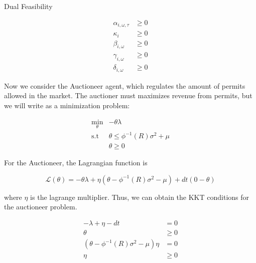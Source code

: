 \documentclass[11pt, letterpaper]{article}
\begin{document}
\smallskip

\begin{flushleft}
Dual Feasibility
\end{flushleft}

\begin{align}
    \alpha_{i,\omega,\tau} & \geq 0 \\
    \kappa_i & \geq 0 \\
    \beta_{i,\omega} & \geq 0 \\
    \gamma_{i,\omega} & \geq 0 \\
    \delta_{i,\omega} & \geq 0 
\end{align}

Now we consider the Auctioneer agent, which regulates the amount of permits allowed in the market.
The auctioner must maximizes revenue from permits, but we will write as a minimization problem:

\begin{align}
    \min_{\theta} & -\theta \lambda \\
    \textrm{s.t \ } & \theta \leq \phi^{-1}(R) \sigma^2 + \mu \\
    &\theta \geq 0
\end{align}

For the Auctioneer, the Lagrangian function is 

\begin{equation}
    \mathcal{L}(\theta)= -\theta \lambda + \eta (\theta - \phi^{-1}(R) \sigma^2 - \mu ) + dt(0-\theta)
\end{equation}

where $\eta$ is the lagrange multiplier. Thus, we can obtain the KKT conditions for the auctioneer problem.

\begin{align}
    -\lambda +\eta -dt & = 0 \\
    \theta & \geq  0 \\
    (\theta - \phi^{-1}(R) \sigma^2 - \mu) \eta & =  0\\
    \eta & \geq  0
\end{align}
\end{document}
